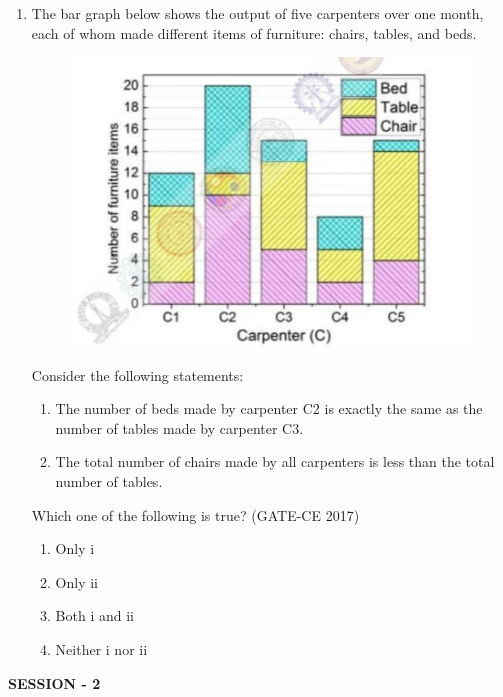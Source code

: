 \documentclass[journal,12pt,onecolumn]{article}
\theoremstyle{remark}
\begin{document}
\begin{enumerate}
    \item The bar graph below shows the output of five carpenters over one month, each of whom made different items of furniture: chairs, tables, and beds. 
    \begin{figure}[H]
    \centering
    \includegraphics[width=0.7\columnwidth]{imageq65.jpg}  
    \caption{}
    \label{fig:12}
    \end{figure}
    Consider the following statements:
    \begin{enumerate}
        \item The number of beds made by carpenter C2 is exactly the same as the number of tables made by carpenter C3.
        \item The total number of chairs made by all carpenters is less than the total number of tables.
    \end{enumerate}
    Which one of the following is true? \hfill (GATE-CE 2017)
    \begin{multicols}{2}
    \begin{enumerate}
        \item Only i
        \item Only ii
        \item Both i and ii
        \item Neither i nor ii
    \end{enumerate}
    \end{multicols}
\end{enumerate}



\textbf{SESSION - 2}
\end{document}
